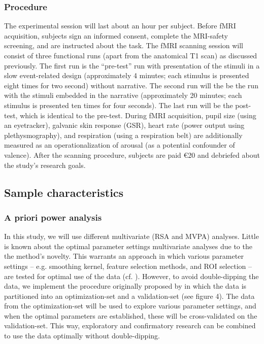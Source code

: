 \documentclass[12pt,a4paper]{article}\usepackage[]{graphicx}\usepackage[]{color}
\begin{document}
\subsubsection{Procedure}
The experimental session will last about an hour per subject. Before fMRI acquisition, subjects sign an informed consent, complete the MRI-safety screening, and are instructed about the task. The fMRI scanning session will consist of three functional runs (apart from the anatomical T1 scan) as discussed previously. The first run is the ``pre-test'' run with presentation of the stimuli in a slow event-related design (approximately 4 minutes; each stimulus is presented eight times for two second) without narrative. The second run will the be the run with the stimuli embedded in the narrative (approximately 20 minutes; each stimulus is presented ten times for four seconds). The last run will be the post-test, which is identical to the pre-test. During fMRI acquisition, pupil size (using an eyetracker), galvanic skin response (GSR), heart rate (power output using plethysmography), and respiration (using a respiration belt) are additionally measured as an operationalization of arousal (as a potential confounder of valence). After the scanning procedure, subjects are paid \euro 20 and debriefed about the study's research goals. 

\subsection{Sample characteristics}

\subsubsection{A priori power analysis}
In this study, we will use different multivariate (RSA and MVPA) analyses. Little is known about the optimal parameter settings multivariate analyses due to the the method's novelty. This warrants an approach in which various parameter settings -- e.g. smoothing kernel, feature selection methods, and ROI selection -- are tested for optimal use of the data (cf. \citealp{kragel2012}). However, to avoid double-dipping the data, we implement the procedure originally proposed by \cite{kriegeskorte2009} in which the data is partitioned into an optimization-set and a validation-set (see figure 4). The data from the optimization-set will be used to explore various parameter settings, and when the optimal parameters are established, these will be cross-validated on the validation-set. This way, exploratory and confirmatory research can be combined to use the data optimally without double-dipping. 
\end{document}
